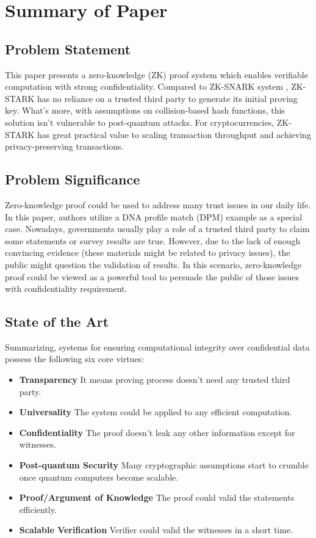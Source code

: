 \documentclass[conference]{IEEEtran}
\begin{document}
\section{Summary of Paper \cite{ben2018scalable}}

\subsection{Problem Statement}
This paper presents a zero-knowledge (ZK) proof system which enables verifiable computation with strong confidentiality.
%
Compared to ZK-SNARK system \cite{ben2013snarks}, ZK-STARK has no reliance on a trusted third party to generate its initial proving key.
%
What's more, with assumptions on collision-based hash functions, this solution isn't vulnerable to post-quantum attacks.
%
For cryptocurrencies, ZK-STARK has great practical value to scaling transaction throughput and achieving privacy-preserving transactions. 

\subsection{Problem Significance}
Zero-knowledge proof could be used to address many trust issues in our daily life.
%
In this paper, authors utilize a DNA profile match (DPM) example as a special case.
%
Nowadays, governments usually play a role of a trusted third party to claim some statements or survey results are true.
%
However, due to the lack of enough convincing evidence (these materials might be related to privacy issues), the public might question the validation of results. 
%
In this scenario, zero-knowledge proof could be viewed as a powerful tool to persuade the public of those issues with confidentiality requirement.


\subsection{State of the Art}
Summarizing, systems for ensuring computational integrity over confidential data possess the following six core virtues:

\begin{itemize}
    \item \textbf{Transparency} It means proving process doesn't need any trusted third party.
    \item \textbf{Universality} The system could be applied to any efficient computation.
    \item \textbf{Confidentiality} The proof doesn't leak any other information except for witnesses.
    \item \textbf{Post-quantum Security} Many cryptographic assumptions start to crumble once quantum computers become scalable.
    \item \textbf{Proof/Argument of Knowledge} The proof could valid the statements efficiently.
    \item \textbf{Scalable Verification} Verifier could valid the witnesses in a short time.
\end{itemize}
\end{document}
